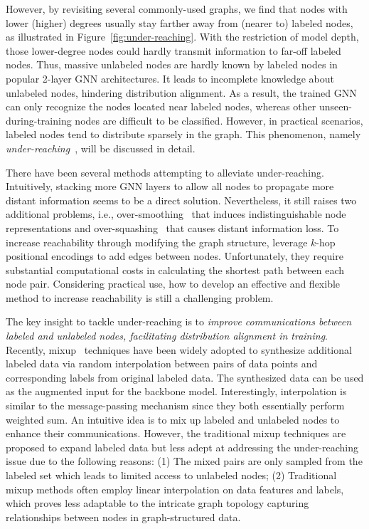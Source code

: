 \documentclass[letterpaper]{article} %
\begin{document}
However, by revisiting several commonly-used graphs, we find that nodes with lower (higher) degrees usually stay farther away from (nearer to) labeled nodes, as illustrated in Figure~\ref{fig:under-reaching}. With the restriction of model depth, those lower-degree nodes could hardly transmit information to far-off labeled nodes. Thus, massive unlabeled nodes are hardly known by labeled nodes in popular 2-layer GNN architectures. It leads to incomplete knowledge about unlabeled nodes, hindering distribution alignment. As a result, the trained GNN can only recognize the nodes located near labeled nodes, whereas other unseen-during-training nodes are difficult to be classified. However, in practical scenarios, labeled nodes tend to distribute sparsely in the graph. This phenomenon, namely \emph{under-reaching}~\cite{pastel, over, rewiring, under_reaching}, will be discussed in detail.

There have been several methods attempting to alleviate under-reaching. Intuitively, stacking more GNN layers to allow all nodes to propagate more distant information seems to be a direct solution. Nevertheless, it still raises two additional problems, i.e., over-smoothing~\cite{li2018deeper} that induces indistinguishable node representations and over-squashing~\cite{bottleneck} that causes distant information loss. To increase reachability through modifying the graph structure, \cite{pastel, rewiring} leverage $k$-hop positional encodings to add edges between nodes. Unfortunately, they require substantial computational costs in calculating the shortest path between each node pair. Considering practical use, how to develop an effective and flexible method to increase reachability is still a challenging problem.

The key insight to tackle under-reaching is to \emph{improve communications between labeled and unlabeled nodes, facilitating distribution alignment in training}. Recently, mixup~\cite{mixup,graphmixup,graphmix,mixup_for_node} techniques have been widely adopted to synthesize additional labeled data via random interpolation between pairs of data points and corresponding labels from original labeled data. The synthesized data can be used as the augmented input for the backbone model. Interestingly, interpolation is similar to the message-passing mechanism since they both essentially perform weighted sum. An intuitive idea is to mix up labeled and unlabeled nodes to enhance their communications. However, the traditional mixup techniques are proposed to expand labeled data but less adept at addressing the under-reaching issue due to the following reasons: (1) The mixed pairs are only sampled from the labeled set which leads to limited access to unlabeled nodes; (2) Traditional mixup methods often employ linear interpolation on data features and labels, which proves less adaptable to the intricate graph topology capturing relationships between nodes in graph-structured data.%
\end{document}
